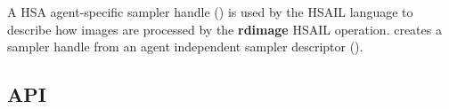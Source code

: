 \documentclass[final]{book}
\newcommand{\reffun}[1]{\textbf{#1}}
\newcommand{\refhsl}[1]{\reffun{#1}}
\begin{document}
A HSA agent-specific sampler handle () is used
by the HSAIL language to describe how images are processed by the
\refhsl{rdimage} HSAIL operation.  creates
a sampler handle from an agent independent sampler descriptor
().

\subsection{API}





\end{document}
